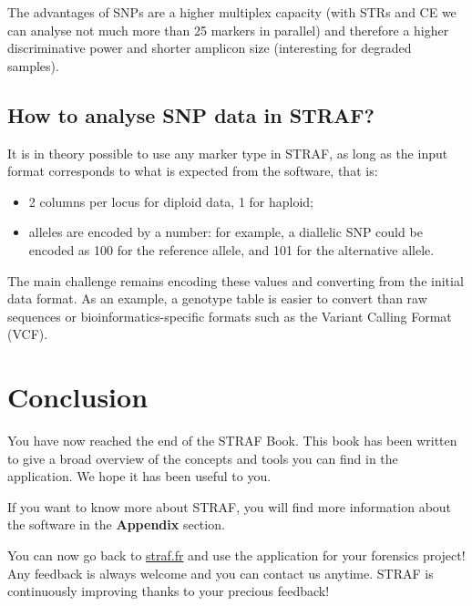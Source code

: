 \documentclass[
]{book}
\begin{document}
The advantages of SNPs are a higher multiplex capacity (with STRs and CE we can
analyse not much more than 25 markers in parallel) and therefore a higher
discriminative power and shorter amplicon size (interesting for degraded samples).

\hypertarget{how-to-analyse-snp-data-in-straf}{%
\section{How to analyse SNP data in STRAF?}\label{how-to-analyse-snp-data-in-straf}}

It is in theory possible to use any marker type in STRAF, as long as the input
format corresponds to what is expected from the software, that is:

\begin{itemize}
\item
  2 columns per locus for diploid data, 1 for haploid;
\item
  alleles are encoded by a number: for example, a diallelic SNP could be encoded as
  100 for the reference allele, and 101 for the alternative allele.
\end{itemize}

The main challenge remains encoding these values and converting from the initial
data format. As an example, a genotype table is easier to convert than raw sequences
or bioinformatics-specific formats such as the Variant Calling Format (VCF).

\hypertarget{conclusion}{%
\chapter{Conclusion}\label{conclusion}}

You have now reached the end of the STRAF Book. This book has been written to give
a broad overview of the concepts and tools you can find in the application.
We hope it has been useful to you.

If you want to know more about STRAF, you will find more information about the
software in the \textbf{Appendix} section.

You can now go back to \url{straf.fr} and use the application for your
forensics project! Any feedback is always welcome and you can contact us anytime.
STRAF is continuously improving thanks to your precious feedback!
\end{document}

